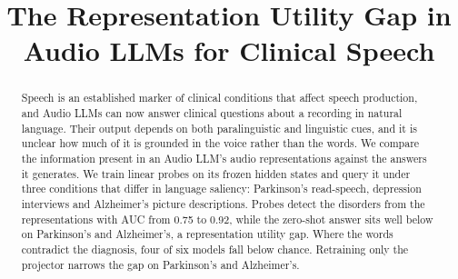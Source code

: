 \documentclass{article}
\begin{document}
\title{The Representation Utility Gap in Audio LLMs for Clinical Speech}

\address{University of Southern California, Los Angeles, CA, USA}

\maketitle

\begin{abstract}
Speech is an established marker of clinical conditions that affect speech production, and Audio LLMs can now answer clinical questions about a recording in natural language. Their output depends on both paralinguistic and linguistic cues, and it is unclear how much of it is grounded in the voice rather than the words. We compare the information present in an Audio LLM's audio representations against the answers it generates. We train linear probes on its frozen hidden states and query it under three conditions that differ in language saliency: Parkinson's read-speech, depression interviews and Alzheimer's picture descriptions. Probes detect the disorders from the representations with AUC from 0.75 to 0.92, while the zero-shot answer sits well below on Parkinson's and Alzheimer's, a representation utility gap. Where the words contradict the diagnosis, four of six models fall below chance. Retraining only the projector narrows the gap on Parkinson's and Alzheimer's.
\end{abstract}
\end{document}
